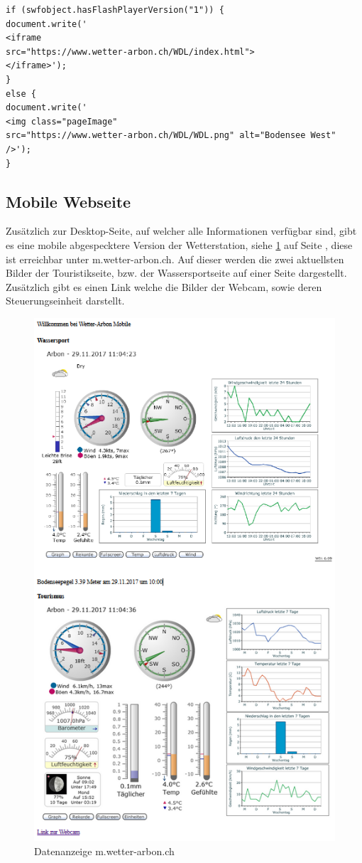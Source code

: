 \documentclass[a4paper,ngerman, 11pt]{report}
\begin{document}
\begin{lstlisting}
if (swfobject.hasFlashPlayerVersion("1")) {
document.write('
<iframe 
src="https://www.wetter-arbon.ch/WDL/index.html">
</iframe>');
} 
else {
document.write('
<img class="pageImage" 
src="https://www.wetter-arbon.ch/WDL/WDL.png" alt="Bodensee West" 
/>');
}
\end{lstlisting}

\subsection{Mobile Webseite}
Zusätzlich zur Desktop-Seite, auf welcher alle Informationen verfügbar sind, gibt es eine mobile abgespecktere Version der Wetterstation, siehe \ref{img:mobilewebseite} auf Seite \pageref{img:mobilewebseite}, diese ist erreichbar unter m.wetter-arbon.ch. Auf dieser werden die zwei aktuellsten Bilder der Touristikseite, bzw. der Wassersportseite auf einer Seite dargestellt. Zusätzlich gibt es einen Link welche die Bilder der Webcam, sowie deren Steuerungseinheit darstellt.
\begin{figure}[htbp]
	\centering
	\includegraphics[width=0.9\linewidth]{img/mobile_webseite}
	\caption{Datenanzeige m.wetter-arbon.ch}
	\label{img:mobilewebseite}
\end{figure}
\end{document}
